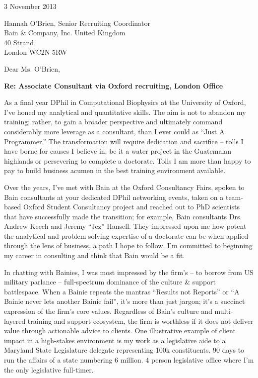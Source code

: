 \documentclass[a4paper]{../res}
\begin{document}
 
\begin{sloppypar}
 
%


\begin{resume} 
 
3 November 2013

Hannah O'Brien, Senior Recruiting Coordinator \\
Bain \& Company, Inc. United Kingdom \\
40 Strand \\
London WC2N 5RW 

Dear Ms. O'Brien, %

\textbf{Re: Associate Consultant via Oxford recruiting, London Office}

As a final year DPhil in Computational Biophysics at the University of Oxford, I've honed my analytical and quantitative skills. The aim is not to abandon my training; rather, to gain a broader perspective and ultimately command considerably more leverage as a consultant, than I ever could as ``Just A Programmer.'' The transformation will require dedication and sacrifice -- tolls I have borne for causes I believe in, be it a water project in the Guatemalan highlands or persevering to complete a doctorate. Tolls I am more than happy to pay to build business acumen in the best training environment available.

Over the years, I've met with Bain at the Oxford Consultancy Fairs, spoken to Bain consultants at your dedicated DPhil networking events, taken on a team-based Oxford Student Consultancy project and reached out to PhD scientists that have successfully made the transition; for example, Bain consultants Drs. Andrew Keech and Jeremy ``Jez'' Hansell. They impressed upon me how potent the analytical and problem solving expertise of a doctorate can be when applied through the lens of business, a path I hope to follow. I'm committed to beginning my career in consulting and think that Bain would be a fit.

In chatting with Bainies, I was most impressed by the firm's -- to borrow from US military parlance -- full-spectrum dominance of the culture \& support battlespace. When a Bainie repeats the mantras ``Results not Reports'' or ``A Bainie never lets another Bainie fail'', it's more than just jargon; it's a succinct expression of the firm's core values. Regardless of Bain's culture and multi-layered training and support ecosystem, the firm is worthless if it does not deliver value through actionable advice to clients. One illustrative example of client impact in a high-stakes environment is my work as a legislative aide to a Maryland State Legislature delegate representing 100k constituents. 90 days to run the affairs of a state numbering 6 million. 4 person legislative office where I'm the only legislative full-timer.


\end{resume}
\end{sloppypar}
\end{document}

